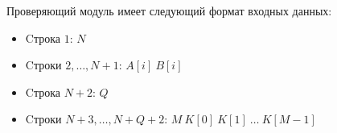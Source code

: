 Проверяющий модуль имеет следующий формат входных данных:
 \begin{itemize}
 \item Cтрока $1$: $N$
 \item Cтроки $2, \ldots , N + 1$: $A[i]\ B[i]$
 \item Cтрока $N + 2$: $Q$
 \item Cтроки $N + 3, \ldots , N + Q + 2$: $M\ K[0]\ K[1]\ \ldots\ K[M - 1]$
 \end{itemize}
 